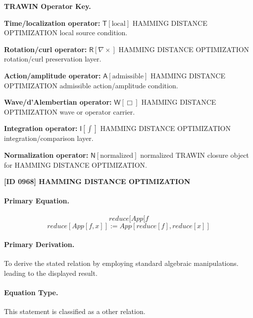 \par\vspace{0.45\baselineskip}
\noindent\begin{minipage}[t]{\linewidth}
\begingroup
\small
\raggedright
\textbf{TRAWIN Operator Key.}\par
\noindent\textbf{Time/localization operator:} $\mathsf{T}\!\left[\mathrm{local}\right]$ HAMMING DISTANCE OPTIMIZATION local source condition.\par
\noindent\textbf{Rotation/curl operator:} $\mathsf{R}\!\left[\nabla\times\right]$ HAMMING DISTANCE OPTIMIZATION rotation/curl preservation layer.\par
\noindent\textbf{Action/amplitude operator:} $\mathsf{A}\!\left[\mathrm{admissible}\right]$ HAMMING DISTANCE OPTIMIZATION admissible action/amplitude condition.\par
\noindent\textbf{Wave/d'Alembertian operator:} $\mathsf{W}\!\left[\Box\right]$ HAMMING DISTANCE OPTIMIZATION wave or operator carrier.\par
\noindent\textbf{Integration operator:} $\mathsf{I}\!\left[\int\right]$ HAMMING DISTANCE OPTIMIZATION integration/comparison layer.\par
\noindent\textbf{Normalization operator:} $\mathsf{N}\!\left[\mathrm{normalized}\right]$ normalized TRAWIN closure object for HAMMING DISTANCE OPTIMIZATION.\par
\endgroup
\end{minipage}

\clearpage
\noindent\textbf{[ID 0968] HAMMING DISTANCE OPTIMIZATION}\par
\vspace{0.35em}
\paragraph{Primary Equation.}
\[
reduce[App[f
\]
\[
reduce[App[f, x]] := App[reduce[f], reduce[x]]
\]

\paragraph{Primary Derivation.}
To derive the stated relation by employing standard algebraic manipulations. leading to the displayed result.
\paragraph{Equation Type.}
This statement is classified as a other relation.

